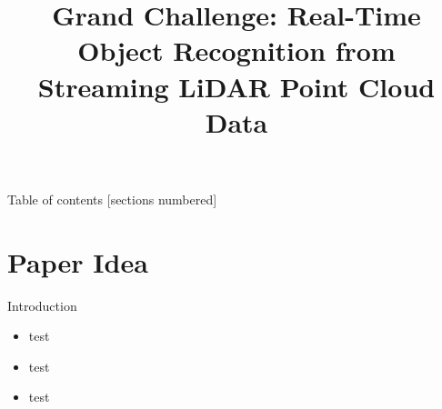 \documentclass[9pt]{beamer}
\title[Real-Time Object Recognition from Streaming LiDAR Point Cloud Data]{Grand Challenge: Real-Time Object Recognition from Streaming LiDAR Point Cloud Data}
\begin{document}







\maketitle






\begin{frame}{Table of contents}
 [sections numbered]
   \tableofcontents[hideallsubsections]
 
 
\end{frame}






\section{Paper Idea}







\begin{frame}[fragile]{Introduction}


 

\begin{itemize}
  \item test    
  \item test    
  \item test    
  
\end{itemize}



\end{frame}
\end{document}
